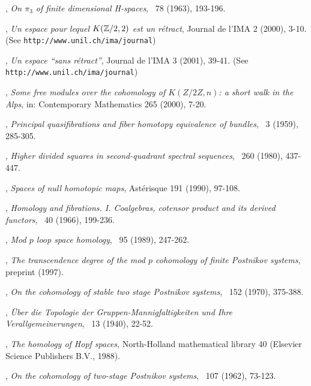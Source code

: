 \begin{thebibliography}{99}
, \textit{On $\pi_3$ of finite dimensional H-spaces}, \ANNMAone\ 78 (1963), 193-196.

, \textit{Un espace pour lequel $K(\mathbb{Z}/2,2)$ est un r\'etract}, Journal de l'IMA 2 (2000), 3-10. (See {\tt http://www.unil.ch/ima/journal})

, \textit{Un espace ``sans r\'etract''}, Journal de l'IMA 3 (2001), 39-41. (See {\tt http://www.unil.ch/ima/journal})

, \textit{Some free modules over the cohomology of $K(Z/2Z,n)$: a short walk in the Alps}, in: Contemporary Mathematics 265 (2000), 7-20.

, \textit{Principal quasifibrations and fiber homotopy equivalence of bundles}, \ILLJM\ 3 (1959), 285-305.

, \textit{Higher divided squares in second-quadrant spectral sequences}, \TRAAM\ 260 (1980), 437-447.

, \textit{Spaces of null homotopic maps}, Ast\'erisque 191 (1990), 97-108.

, \textit{Homology and fibrations. I. Coalgebras, cotensor product and its derived functors},  \COMMH\ 40 (1966), 199-236.

, \textit{Mod $p$ loop space homology}, \INVEM\ 95 (1989), 247-262.

, \textit{The transcendence degree of the mod $p$ cohomology of finite Postnikov systems}, preprint (1997).

, \textit{On the cohomology of stable two stage Postnikov systems}, \TRAAM\ 152 (1970), 375-388.

, \textit{\"Uber die Topologie der Gruppen-Mannigfaltigkeiten und Ihre Verallgemeinerungen}, \ANNMAone\ 13 (1940), 22-52.

, \textit{The homology of Hopf spaces}, North-Holland mathematical library 40 (Elsevier Science Publishers B.V., 1988).

, \textit{On the cohomology of two-stage Postnikov systems}, \ACTAMone\ 107 (1962), 73-123.


\end{thebibliography}
